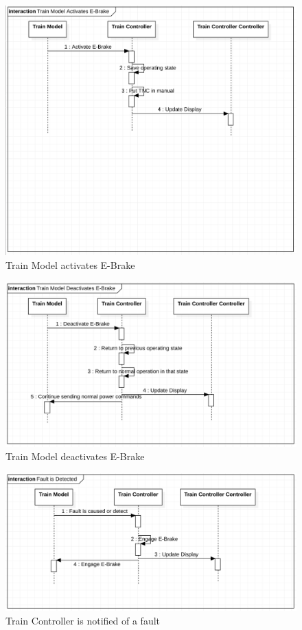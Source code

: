 \documentclass{article}
\begin{document}
    \begin{figure}[H]
        \centering
        \includegraphics[width=\textwidth]{./TNCSD/TrnModelAct.png}
        \caption{Train Model activates E-Brake}
        \label{fig:Train Model activates E-Brake}
    \end{figure}
    
    \begin{figure}[H]
        \centering
        \includegraphics[width=\textwidth]{./TNCSD/TrnModelDeact.png}
        \caption{Train Model deactivates E-Brake}
        \label{fig:Train Model deactivates E-Brake}
    \end{figure}
    
    \begin{figure}[H]
        \centering
        \includegraphics[width=\textwidth]{./TNCSD/FaultDetected.png}
        \caption{Train Controller is notified of a fault}
        \label{fig:Train Controller is notified of a fault}
    \end{figure}
\end{document}
